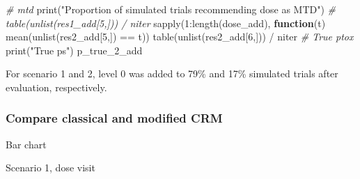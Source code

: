 \documentclass[
]{article}
\newenvironment{Shaded}{\begin{snugshade}}{\end{snugshade}}
\newcommand{\CommentTok}[1]{\textcolor[rgb]{0.56,0.35,0.01}{\textit{#1}}}
\newcommand{\ControlFlowTok}[1]{\textcolor[rgb]{0.13,0.29,0.53}{\textbf{#1}}}
\newcommand{\DecValTok}[1]{\textcolor[rgb]{0.00,0.00,0.81}{#1}}
\newcommand{\FunctionTok}[1]{\textcolor[rgb]{0.00,0.00,0.00}{#1}}
\newcommand{\NormalTok}[1]{#1}
\newcommand{\SpecialCharTok}[1]{\textcolor[rgb]{0.00,0.00,0.00}{#1}}
\newcommand{\StringTok}[1]{\textcolor[rgb]{0.31,0.60,0.02}{#1}}
\begin{document}
\begin{Shaded}
\begin{Highlighting}[]
\CommentTok{\# mtd}
\FunctionTok{print}\NormalTok{(}\StringTok{"Proportion of simulated trials recommending dose as MTD"}\NormalTok{)}
\CommentTok{\# table(unlist(res1\_add[5,])) / niter}
\FunctionTok{sapply}\NormalTok{(}\DecValTok{1}\SpecialCharTok{:}\FunctionTok{length}\NormalTok{(dose\_add), }\ControlFlowTok{function}\NormalTok{(t) }\FunctionTok{mean}\NormalTok{(}\FunctionTok{unlist}\NormalTok{(res2\_add[}\DecValTok{5}\NormalTok{,]) }\SpecialCharTok{==}\NormalTok{ t))}
\FunctionTok{table}\NormalTok{(}\FunctionTok{unlist}\NormalTok{(res2\_add[}\DecValTok{6}\NormalTok{,])) }\SpecialCharTok{/}\NormalTok{ niter}
\CommentTok{\# True ptox}
\FunctionTok{print}\NormalTok{(}\StringTok{"True p\textquotesingle{}s"}\NormalTok{)}
\NormalTok{p\_true\_2\_add}
\end{Highlighting}
\end{Shaded}

For scenario 1 and 2, level 0 was added to 79\% and 17\% simulated
trials after evaluation, respectively.

\hypertarget{compare-classical-and-modified-crm}{%
\subsubsection{Compare classical and modified
CRM}\label{compare-classical-and-modified-crm}}

Bar chart

Scenario 1, dose visit
\end{document}
